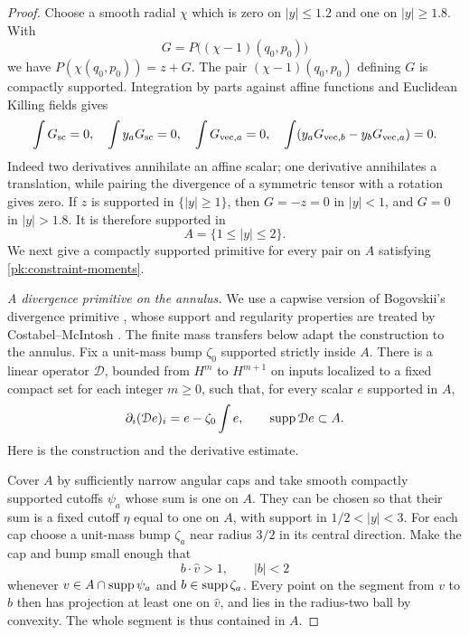 \begin{proof}
Choose a smooth radial \(\chi\) which is zero on \(|y|\leq1.2\)
and one on \(|y|\geq1.8\).  With
\[
 G=P\bigl((\chi-1)(q_0,p_0)\bigr)
\]
we have \(P(\chi(q_0,p_0))=z+G\). The pair
\((\chi-1)(q_0,p_0)\) defining \(G\) is compactly supported.
Integration by parts against affine
functions and Euclidean Killing fields gives
\begin{equation}
 \int G_{\rm sc}=0,\quad \int y_aG_{\rm sc}=0,\quad
 \int G_{{\rm vec},a}=0,\quad
 \int(y_aG_{{\rm vec},b}-y_bG_{{\rm vec},a})=0.
 \label{pk:constraint-moments}
\end{equation}
Indeed two derivatives annihilate an affine scalar; one derivative
annihilates a translation, while pairing the divergence of a symmetric
tensor with a rotation gives zero.  If \(z\) is supported in
\(\{|y|\geq1\}\), then \(G=-z=0\) in \(|y|<1\), and \(G=0\) in
\(|y|>1.8\).  It is therefore supported in
\[
 A=\{1\leq|y|\leq2\}.
\]
We next give a compactly supported primitive for every pair on \(A\)
satisfying \eqref{pk:constraint-moments}.

\smallskip
\emph{A divergence primitive on the annulus.}
We use a capwise version of Bogovskii's divergence primitive
\cite{Bogovskii1980}, whose support and regularity properties are treated
by Costabel--McIntosh \cite{CostabelMcIntosh2010}. The finite mass
transfers below adapt the construction to the annulus.
Fix a unit-mass bump \(\zeta_0\) supported strictly inside \(A\).
There is a linear operator \(\mathcal D\), bounded from \(H^m\) to
\(H^{m+1}\) on inputs localized to a fixed compact set for each integer
\(m\geq0\), such that, for every scalar \(e\) supported in \(A\),
\begin{equation}
 \partial_i(\mathcal De)_i=e-\zeta_0\int e,
 \qquad \operatorname{supp}\mathcal De\subset A.
 \label{pk:constraint-divergence}
\end{equation}
Here is the construction and the derivative estimate.

Cover \(A\) by sufficiently narrow angular caps and take smooth
compactly supported cutoffs \(\psi_a\) whose sum is one on \(A\).
They can be chosen so that their sum is a fixed cutoff \(\eta\)
equal to one on \(A\), with support in \(1/2<|y|<3\).
For each cap choose a unit-mass bump \(\zeta_a\) near radius \(3/2\)
in its central direction.  Make the cap and bump small enough that
\[
 b\cdot\widehat v>1,\qquad |b|<2
\]
whenever \(v\in A\cap\operatorname{supp}\psi_a\) and \(b\in\operatorname{supp}\zeta_a\).
Every point on the segment from \(v\) to \(b\) then has projection
at least one on \(\widehat v\), and lies in the radius-two ball by
convexity.  The whole segment is thus contained in \(A\).


\end{proof}
